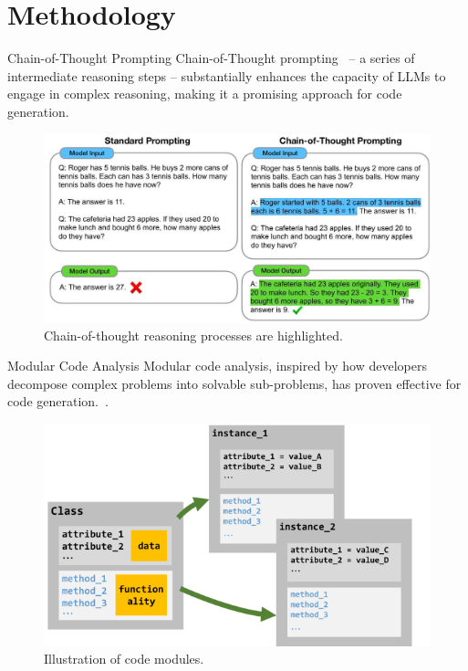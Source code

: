 \section{Methodology}

\begin{frame}{Chain-of-Thought Prompting}
    Chain-of-Thought prompting~\cite{wei2023chainofthought} -- a series of intermediate reasoning steps -- substantially enhances the capacity of LLMs to engage in complex reasoning, making it a promising approach for code generation.
    \begin{figure}[!htb]
        \centering
        \includegraphics[scale=0.20]{img/cot_prompting}
        \captionsetup{font=small}
        \caption{Chain-of-thought reasoning processes are highlighted.}
    \end{figure}
\end{frame}

\begin{frame}{Modular Code Analysis}
    Modular code analysis, inspired by how developers decompose complex problems into solvable sub-problems, has proven effective for code generation.~\cite{le2023codechain}.
    \begin{figure}[!htb]
        \centering
        \includegraphics[scale=0.50]{img/class_diagram}
        \captionsetup{font=small}
        \caption{Illustration of code modules.}
    \end{figure}
\end{frame}
